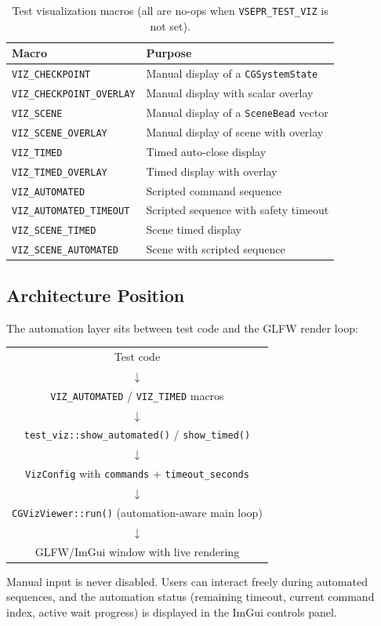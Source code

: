 \documentclass[11pt]{article}
\newcommand{\type}[1]{\texttt{#1}}
\newcommand{\fn}[1]{\texttt{#1}}
\begin{document}
\begin{table}[h]
\centering
\caption{Test visualization macros (all are no-ops when
  \texttt{VSEPR\_TEST\_VIZ} is not set).}
\label{tab:viz-macros}
\begin{tabular}{@{}lp{8cm}@{}}
\toprule
\textbf{Macro} & \textbf{Purpose} \\
\midrule
\fn{VIZ\_CHECKPOINT}          & Manual display of a \type{CGSystemState} \\
\fn{VIZ\_CHECKPOINT\_OVERLAY} & Manual display with scalar overlay \\
\fn{VIZ\_SCENE}               & Manual display of a \type{SceneBead} vector \\
\fn{VIZ\_SCENE\_OVERLAY}      & Manual display of scene with overlay \\
\fn{VIZ\_TIMED}               & Timed auto-close display \\
\fn{VIZ\_TIMED\_OVERLAY}      & Timed display with overlay \\
\fn{VIZ\_AUTOMATED}           & Scripted command sequence \\
\fn{VIZ\_AUTOMATED\_TIMEOUT}  & Scripted sequence with safety timeout \\
\fn{VIZ\_SCENE\_TIMED}        & Scene timed display \\
\fn{VIZ\_SCENE\_AUTOMATED}    & Scene with scripted sequence \\
\bottomrule
\end{tabular}
\end{table}

\subsection{Architecture Position}

The automation layer sits between test code and the GLFW render loop:

\begin{center}
\begin{tabular}{c}
Test code \\
$\downarrow$ \\
\fn{VIZ\_AUTOMATED} / \fn{VIZ\_TIMED} macros \\
$\downarrow$ \\
\fn{test\_viz::show\_automated()} / \fn{show\_timed()} \\
$\downarrow$ \\
\fn{VizConfig} with \fn{commands} + \fn{timeout\_seconds} \\
$\downarrow$ \\
\fn{CGVizViewer::run()} (automation-aware main loop) \\
$\downarrow$ \\
GLFW/ImGui window with live rendering
\end{tabular}
\end{center}

Manual input is never disabled.  Users can interact freely during
automated sequences, and the automation status (remaining timeout,
current command index, active wait progress) is displayed in the
ImGui controls panel.
\end{document}
